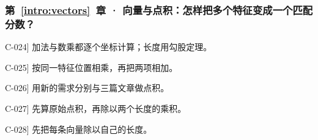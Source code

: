 \subsubsection*{第~\ref*{intro:vectors}~章 · 向量与点积：怎样把多个特征变成一个匹配分数？}
\begin{answerhints}
\item[\hyperref[exercise:vector-coordinate-operations]{C-024}] \leavevmode{}\label{hint:vector-coordinate-operations}加法与数乘都逐个坐标计算；长度用勾股定理。
\item[\hyperref[exercise:unit-vector-dot-comparison]{C-025}] \leavevmode{}\label{hint:unit-vector-dot-comparison}按同一特征位置相乘，再把两项相加。
\item[\hyperref[exercise:article-query-ranking]{C-026}] \leavevmode{}\label{hint:article-query-ranking}用新的需求分别与三篇文章做点积。
\item[\hyperref[exercise:cosine-rescaling]{C-027}] \leavevmode{}\label{hint:cosine-rescaling}先算原始点积，再除以两个长度的乘积。
\item[\hyperref[exercise:cosine-length-control]{C-028}] \leavevmode{}\label{hint:cosine-length-control}先把每条向量除以自己的长度。
\end{answerhints}
